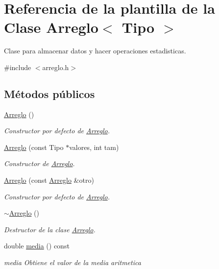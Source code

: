 \hypertarget{class_arreglo}{}\section{Referencia de la plantilla de la Clase Arreglo$<$ Tipo $>$}
\label{class_arreglo}


Clase para almacenar datos y hacer operaciones estadisticas.  




{\ttfamily \#include $<$arreglo.\+h$>$}

\subsection*{Métodos públicos}
\begin{DoxyCompactItemize}
\item 
\hyperlink{class_arreglo_a6675919f9bee34731943b4cde7d60fff}{Arreglo} ()
\begin{DoxyCompactList}\small\item\em Constructor por defecto de \hyperlink{class_arreglo}{Arreglo}. \end{DoxyCompactList}\item 
\hyperlink{class_arreglo_a2fbab0dd6c8a922e165711649a6a7640}{Arreglo} (const Tipo $\ast$valores, int tam)
\begin{DoxyCompactList}\small\item\em Constructor de \hyperlink{class_arreglo}{Arreglo}. \end{DoxyCompactList}\item 
\hyperlink{class_arreglo_a7917d5870c310e1ccabe456fd82b445a}{Arreglo} (const \hyperlink{class_arreglo}{Arreglo} \&otro)
\begin{DoxyCompactList}\small\item\em Constructor por defecto de \hyperlink{class_arreglo}{Arreglo}. \end{DoxyCompactList}\item 
\hyperlink{class_arreglo_a1f22e8ac100a6dcc3e18f7850bde7b0a}{$\sim$\+Arreglo} ()
\begin{DoxyCompactList}\small\item\em Destructor de la clase \hyperlink{class_arreglo}{Arreglo}. \end{DoxyCompactList}\item 
double \hyperlink{class_arreglo_a3520ce3d2a9d701d5a4543897be362c0}{media} () const
\begin{DoxyCompactList}\small\item\em media Obtiene el valor de la media aritmetica \end{DoxyCompactList}\item 

\end{DoxyCompactItemize}
